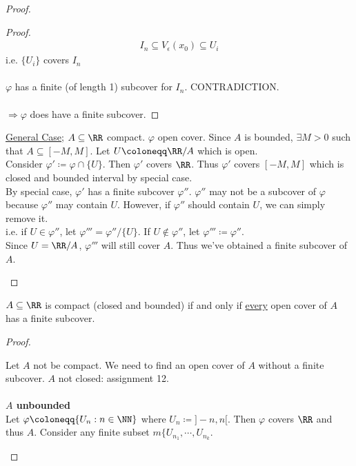 \documentclass[class=scrartcl, crop=false]{standalone}
\begin{document}
\begin{theorem}
\begin{proof}
\begin{itemize}
\begin{proof}
\begin{gather*}
          I_n \subseteq V_\epsilon(x_0) \subseteq U_i
        \end{gather*}
        i.e. $\{U_i\}$ covers $I_n$
        \\\\
        $\varphi$ has a finite (of length 1) subcover for $I_n$. CONTRADICTION.
        \\\\
        $\Rightarrow \varphi$ does have a finite subcover.
      \end{proof} 
      \ul{General Case}; $A \subseteq \RR$ compact. $\varphi$ open cover. Since $A$ is bounded, $\exists M > 0$ such that $A \subseteq [-M, M]$. Let $U \coloneqq \RR / A$ which is open.
      \\
      Consider $\varphi' \coloneqq \varphi \cap \{U\}$. Then $\varphi'$ covers $\RR$. Thus $\varphi '$ covers $[-M, M]$ which is closed and bounded interval by special case.
      \\
      By special case, $\varphi '$ has a finite subcover $\varphi''$. $\varphi''$ may not be a subcover of $\varphi$ because $\varphi''$ may contain $U$. However, if $\varphi''$ should contain $U$, we can simply remove it.
      \\
      i.e. if $U \in \varphi''$, let $\varphi''' = \varphi'' / \{U\}$. If $U \notin \varphi''$, let $\varphi''' \coloneqq \varphi''$.
      \\
      Since $U = \RR / A$, $\varphi'''$ will still cover $A$. Thus we've obtained a finite subcover of $A$.
    \end{itemize} 
    \end{proof} 
\end{theorem} 

\begin{theorem}
   $A \subseteq \RR$ is compact (closed and bounded) if and only if \ul{every} open cover of $A$ has a finite subcover.
  \begin{proof}
    \begin{itemize}
      \ii[]
      \ii[$\Leftarrow$] 
      Let $A$ not be compact. We need to find an open cover of $A$ without a finite subcover. $A$ not closed: assignment 12.
      \\\\
      \textbf{$A$ unbounded}
      \\
      Let $\varphi \coloneqq \{U_n : n \in \NN\}$ where $U_n \coloneqq ]-n, n[$. Then $\varphi$ covers $\RR$ and thus $A$. Consider any finite subset ${m\{U_{n_1}}, \cdots, U_{n_k}$. 
    \end{itemize} 
  \end{proof}
 
\end{theorem} 
\end{document}
